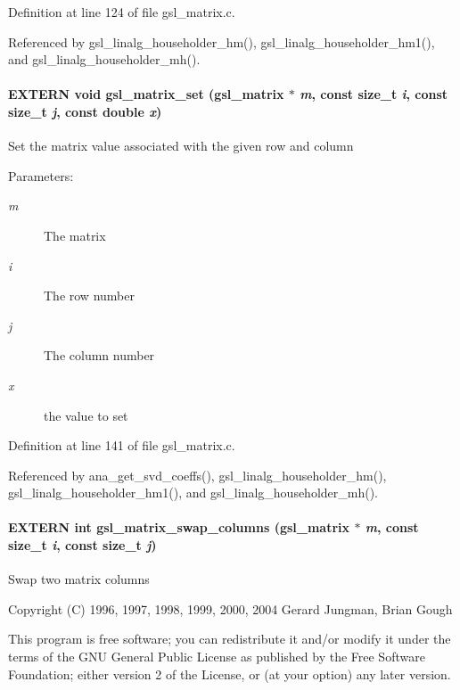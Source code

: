 Definition at line 124 of file gsl\_\-matrix.c.

Referenced by gsl\_\-linalg\_\-householder\_\-hm(), gsl\_\-linalg\_\-householder\_\-hm1(), and gsl\_\-linalg\_\-householder\_\-mh().
\paragraph[gsl\_\-matrix\_\-set]{\setlength{\rightskip}{0pt plus 5cm}EXTERN void gsl\_\-matrix\_\-set (gsl\_\-matrix $\ast$ {\em m}, \/  const size\_\-t {\em i}, \/  const size\_\-t {\em j}, \/  const double {\em x})}\hfill\label{group__nr_g1078f25f8d71ec497d5aaa9c6b5f3cef}


Set the matrix value associated with the given row and column

\begin{Desc}
\item[Parameters:]
\begin{description}
\item[{\em m}]The matrix \item[{\em i}]The row number \item[{\em j}]The column number \item[{\em x}]the value to set \end{description}
\end{Desc}


Definition at line 141 of file gsl\_\-matrix.c.

Referenced by ana\_\-get\_\-svd\_\-coeffs(), gsl\_\-linalg\_\-householder\_\-hm(), gsl\_\-linalg\_\-householder\_\-hm1(), and gsl\_\-linalg\_\-householder\_\-mh().
\paragraph[gsl\_\-matrix\_\-swap\_\-columns]{\setlength{\rightskip}{0pt plus 5cm}EXTERN int gsl\_\-matrix\_\-swap\_\-columns (gsl\_\-matrix $\ast$ {\em m}, \/  const size\_\-t {\em i}, \/  const size\_\-t {\em j})}\hfill\label{group__nr_g142275639955ea7936056b560df8bef4}


Swap two matrix columns

Copyright (C) 1996, 1997, 1998, 1999, 2000, 2004 Gerard Jungman, Brian Gough

This program is free software; you can redistribute it and/or modify it under the terms of the GNU General Public License as published by the Free Software Foundation; either version 2 of the License, or (at your option) any later version.

